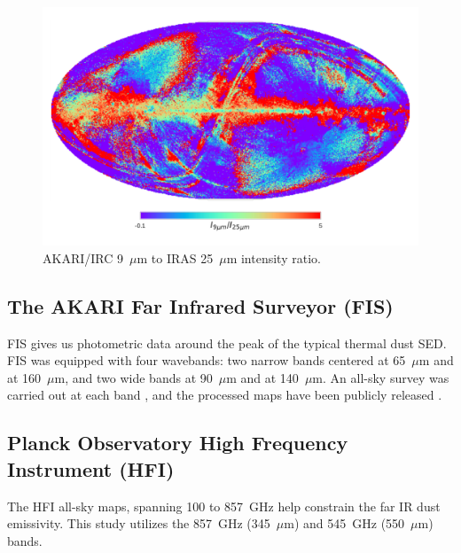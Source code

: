              \begin{figure}
               \centering
               \includegraphics[width=\textwidth]{../Plots/ch_datasources/ratioMap_A9I25.pdf}
               \caption{ AKARI/IRC 9~$\mu$m to IRAS 25~$\mu$m intensity ratio.}
               \label{fig:ratioMap_A9I25}
             \end{figure}

    \subsection{The AKARI Far Infrared Surveyor (FIS)}
       FIS gives us photometric data around the peak of the typical thermal dust SED. FIS was equipped with four wavebands: two narrow bands centered at 65~$\mu$m and at 160~$\mu$m, and two wide bands at 90~$\mu$m and at 140~$\mu$m. An all-sky survey was carried out at each band \citep{kawada07}, and the processed maps have been publicly released \citep{doi15}.

    \subsection{Planck Observatory High Frequency Instrument (HFI)}
       The HFI all-sky maps, spanning 100 to 857~GHz \citep{hfi14viii} help constrain the far IR dust emissivity. This study utilizes the 857~GHz (345~$\mu$m) and 545~GHz (550~$\mu$m) bands.

